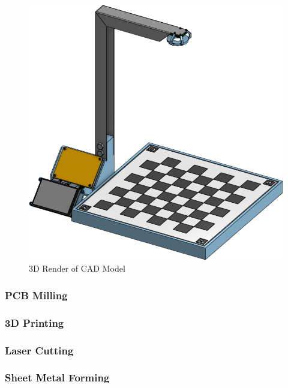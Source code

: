 \documentclass[journal]{IEEEtran}
\begin{document}
\begin{figure}[!ht]
	\centering
	\includegraphics[width=\linewidth]{Images/Render.png}
	\caption{3D Render of CAD Model}
	\label{render}
\end{figure}

\vspace{12pt}

\subsubsection{PCB Milling}


\vspace{12pt}

\subsubsection{3D Printing}

\vspace{12pt}

\subsubsection{Laser Cutting}

\vspace{12pt}

\subsubsection{Sheet Metal Forming}
\end{document}
